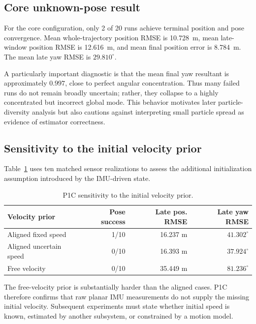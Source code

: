 \subsection{Core unknown-pose result}
For the core configuration, only 2 of 20 runs achieve terminal position and pose convergence. Mean whole-trajectory position RMSE is \SI{10.728}{m}, mean late-window position RMSE is \SI{12.616}{m}, and mean final position error is \SI{8.784}{m}. The mean late yaw RMSE is $29.810^{\circ}$.

A particularly important diagnostic is that the mean final yaw resultant is approximately $0.997$, close to perfect angular concentration. Thus many failed runs do not remain broadly uncertain; rather, they collapse to a highly concentrated but incorrect global mode. This behavior motivates later particle-diversity analysis but also cautions against interpreting small particle spread as evidence of estimator correctness.

\subsection{Sensitivity to the initial velocity prior}
Table~\ref{tab:p1c_velocity} uses ten matched sensor realizations to assess the additional initialization assumption introduced by the IMU-driven state.
\begin{table}[ht]
\centering
\caption{P1C sensitivity to the initial velocity prior.}
\label{tab:p1c_velocity}
\begin{tabular}{lrrr}
\toprule
Velocity prior & Pose success & Late pos. RMSE & Late yaw RMSE\\
\midrule
Aligned fixed speed & 1/10 & 16.237 m & $41.302^{\circ}$\\
Aligned uncertain speed & 0/10 & 16.393 m & $37.924^{\circ}$\\
Free velocity & 0/10 & 35.449 m & $81.236^{\circ}$\\
\bottomrule
\end{tabular}
\end{table}
The free-velocity prior is substantially harder than the aligned cases. P1C therefore confirms that raw planar IMU measurements do not supply the missing initial velocity. Subsequent experiments must state whether initial speed is known, estimated by another subsystem, or constrained by a motion model.

